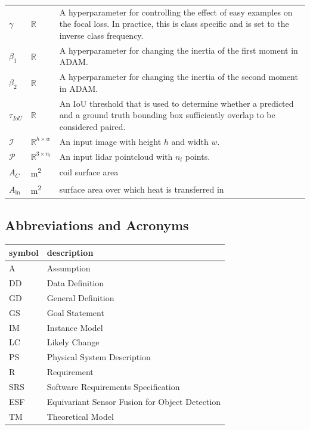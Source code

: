 \documentclass[12pt]{article}
\newcommand{\ProjectName}{ESF }
\begin{document}
\begin{longtable*}{l l p{12cm}}
\\
$\gamma$ & $\mathbb{R}$ & A hyperparameter for controlling the effect of easy examples on the focal loss. In practice, this is class specific and is set to the inverse class frequency.
\\
$\beta_1$ & $\mathbb{R}$ & A hyperparameter for changing the inertia of the first moment in ADAM.
\\
$\beta_2$ & $\mathbb{R}$ & A hyperparameter for changing the inertia of the second moment in ADAM.
\\
$\tau_{IoU}$ & $\mathbb{R}$ & An IoU threshold that is used to determine whether a predicted and a ground truth bounding box sufficiently overlap to be considered paired.
\\
$\mathcal{I}$ & $\mathbb{R}^{h\times{}w}$ & An input image with height $h$ and width $w$.
\\
$\mathcal{P}$ & $\mathbb{R}^{3\times{}n_l}$ & An input lidar pointcloud with $n_l$ points.
\\
$A_C$ & \si[per-mode=symbol] {\square\metre} & coil surface area
\\
$A_\text{in}$ & \si[per-mode=symbol] {\square\metre} & surface area over 
which heat is transferred in
\\ 
\bottomrule
\end{longtable*}

\subsection{Abbreviations and Acronyms}

\renewcommand{\arraystretch}{1.2}
\begin{tabular}{l l} 
  \toprule		
  \textbf{symbol} & \textbf{description}\\
  \midrule 
  A & Assumption\\
  DD & Data Definition\\
  GD & General Definition\\
  GS & Goal Statement\\
  IM & Instance Model\\
  LC & Likely Change\\
  PS & Physical System Description\\
  R & Requirement\\
  SRS & Software Requirements Specification\\
  \ProjectName & Equivariant Sensor Fusion for Object Detection\\
  TM & Theoretical Model\\
  \bottomrule
\end{tabular}\\
\end{document}
